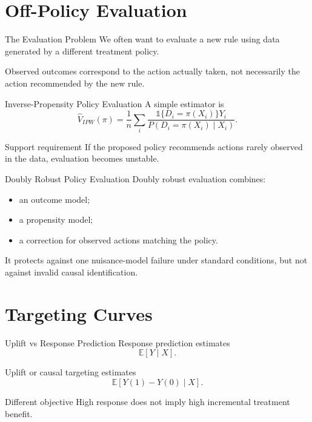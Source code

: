 \documentclass[aspectratio=169,11pt]{beamer}
\newcommand{\E}{\mathbb{E}}
\begin{document}
\section{Off-Policy Evaluation}

\begin{frame}{The Evaluation Problem}
We often want to evaluate a new rule using data generated by a different treatment policy.

Observed outcomes correspond to the action actually taken, not necessarily the action recommended by the new rule.
\end{frame}

\begin{frame}{Inverse-Propensity Policy Evaluation}
A simple estimator is
\[
\widehat V_{IPW}(\pi)
=
\frac{1}{n}\sum_i
\frac{\mathbb{1}\{D_i=\pi(X_i)\}Y_i}
{P(D_i=\pi(X_i)\mid X_i)}.
\]

\begin{alertblock}{Support requirement}
If the proposed policy recommends actions rarely observed in the data, evaluation becomes unstable.
\end{alertblock}
\end{frame}

\begin{frame}{Doubly Robust Policy Evaluation}
Doubly robust evaluation combines:
\begin{itemize}
\item an outcome model;
\item a propensity model;
\item a correction for observed actions matching the policy.
\end{itemize}

It protects against one nuisance-model failure under standard conditions, but not against invalid causal identification.
\end{frame}

\section{Targeting Curves}

\begin{frame}{Uplift vs Response Prediction}
Response prediction estimates
\[
\E[Y\mid X].
\]

Uplift or causal targeting estimates
\[
\E[Y(1)-Y(0)\mid X].
\]

\begin{alertblock}{Different objective}
High response does not imply high incremental treatment benefit.
\end{alertblock}
\end{frame}
\end{document}
